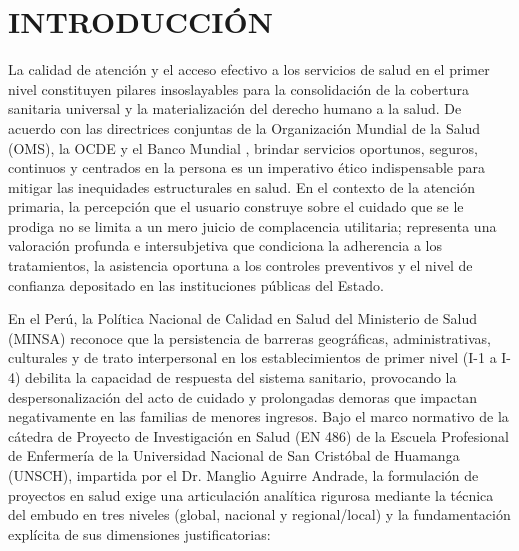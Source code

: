 \section*{INTRODUCCIÓN}
\label{sec:intro}

La calidad de atención y el acceso efectivo a los servicios de salud en el primer nivel constituyen pilares insoslayables para la consolidación de la cobertura sanitaria universal y la materialización del derecho humano a la salud. De acuerdo con las directrices conjuntas de la Organización Mundial de la Salud (OMS), la OCDE y el Banco Mundial \cite{who2018}, brindar servicios oportunos, seguros, continuos y centrados en la persona es un imperativo ético indispensable para mitigar las inequidades estructurales en salud. En el contexto de la atención primaria, la percepción que el usuario construye sobre el cuidado que se le prodiga no se limita a un mero juicio de complacencia utilitaria; representa una valoración profunda e intersubjetiva que condiciona la adherencia a los tratamientos, la asistencia oportuna a los controles preventivos y el nivel de confianza depositado en las instituciones públicas del Estado.

En el Perú, la Política Nacional de Calidad en Salud del Ministerio de Salud (MINSA) \cite{minsacalidad2021} reconoce que la persistencia de barreras geográficas, administrativas, culturales y de trato interpersonal en los establecimientos de primer nivel (I-1 a I-4) debilita la capacidad de respuesta del sistema sanitario, provocando la despersonalización del acto de cuidado y prolongadas demoras que impactan negativamente en las familias de menores ingresos. Bajo el marco normativo de la cátedra de Proyecto de Investigación en Salud (EN 486) de la Escuela Profesional de Enfermería de la Universidad Nacional de San Cristóbal de Huamanga (UNSCH), impartida por el Dr. Manglio Aguirre Andrade, la formulación de proyectos en salud exige una articulación analítica rigurosa mediante la técnica del embudo en tres niveles (global, nacional y regional/local) y la fundamentación explícita de sus dimensiones justificatorias:

